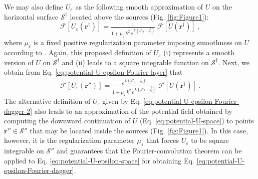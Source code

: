 We may also define $U_{\varepsilon}$ as the following smooth approximation of $U$ on the horizontal surface 
$\mathcal{S}^{\dagger}$ located above the sources (Fig. \ref{fig:Figure1}):
\begin{equation}
	\mathcal{F} [ U_{\varepsilon}(\mathbf{r}^{\dagger}) ] = 
	\tfrac{1}{1 + \mu_{\varepsilon} \, k^{2} \, e^{\, k \, (z''_{0} - z^{\dagger}_{0})}} \; 
	\mathcal{F} [ U(\mathbf{r}^{\dagger}) ] \: ,
	\label{eq:potential-U-epsilon-Fourier-dagger-2}
\end{equation}
where $\mu_{\varepsilon}$ is a fixed positive regularization parameter imposing smoothness on $U$ 
according to \cite{pasteka_etal2012}. 
Again, this proposed definition of $U_{\varepsilon}$ 
(i) represents a smooth version of $U$ on $\mathcal{S}^{\dagger}$ and
(ii) leads to a square integrable function on $\mathcal{S}^{\dagger}$.
Next, we obtain from Eq. \ref{eq:potential-U-epsilon-Fourier-layer} that 
\begin{equation}
	\mathcal{F} \left[ U_{\varepsilon}(\mathbf{r}'') \right] = 
	\tfrac{e^{\, k \, (z''_{0} - z^{\dagger}_{0})}}{1 + \mu_{\varepsilon} \, k^{2} \, e^{\, k \, (z''_{0} - z^{\dagger}_{0})}} \; 
	\mathcal{F} [ U(\mathbf{r}^{\dagger}) ] \: .
	\label{eq:potential-U-epsilon-Fourier-layer-2}
\end{equation}
The alternative definition of $U_{\varepsilon}$ given by Eq. \ref{eq:potential-U-epsilon-Fourier-dagger-2} 
also leads to an approximation of the potential field obtained by 
computing the downward continuation of $U$ (Eq. \ref{eq:potential-U-space}) 
to points $\mathbf{r}'' \in \mathcal{S}''$ that may be located inside the sources (Fig. \ref{fig:Figure1}). 
In this case, however, it is the regularization parameter $\mu_{\varepsilon}$ that forces  
$U_{\varepsilon}$ to be square integrable on $\mathcal{S}''$ and guarantees that the 
Fourier-convolution theorem can be applied to Eq. \ref{eq:potential-U-epsilon-space} 
for obtaining Eq. \ref{eq:potential-U-epsilon-Fourier-dagger}.

